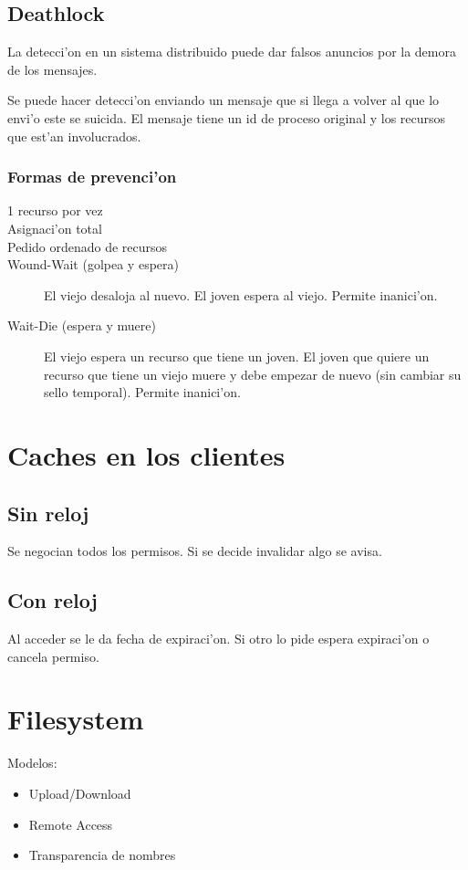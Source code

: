 \documentclass[a4paper,spanish]{article}
\begin{document}
\subsection{Deathlock}
La detecci'on en un sistema distribuido puede dar falsos anuncios por la demora
de los mensajes.

Se puede hacer detecci'on enviando un mensaje que si llega a volver al que lo
envi'o este se suicida. El mensaje tiene un id de proceso original y los
recursos que est'an involucrados.

\subsubsection{Formas de prevenci'on}
\begin{description}
	\item[1 recurso por vez]
	\item[Asignaci'on total]
	\item[Pedido ordenado de recursos]
	\item[Wound-Wait (golpea y espera)] El viejo desaloja al nuevo. El
joven espera al viejo. Permite inanici'on.
	\item[Wait-Die (espera y muere)] El viejo espera un recurso que tiene
un joven. El joven que quiere un recurso que tiene un viejo muere y debe
empezar de nuevo (sin cambiar su sello temporal). Permite inanici'on.
\end{description}

\section{Caches en los clientes}
\subsection{Sin reloj}
Se negocian todos los permisos. Si se decide invalidar algo se avisa.

\subsection{Con reloj}
Al acceder se le da fecha de expiraci'on. Si otro lo pide espera expiraci'on o
cancela permiso.
	
\section{Filesystem}
Modelos:
\begin{itemize}
	\item Upload/Download
	\item Remote Access
	\item Transparencia de nombres
\end{itemize}
\end{document}
